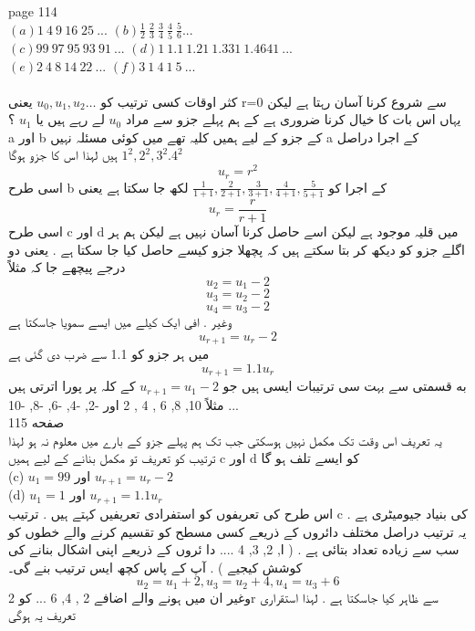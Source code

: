 page 114\\
\((a) 1 \: 4 \:  9 \:  16 \;  25 \: ... \) \hspace{10pt} \( (b)\frac{1}{2} \:  \frac{2}{3} \:  \frac{3}{4} \:  \frac{4}{5} \:  \frac{5}{6} ... \) \\ \( (c) 99 \:  97 \:  95 \:  93 \:  91 \: ... \)\hspace{10pt} \((d) 1 \:  1.1 \:  1.21 \:  1.331 \:  1.4641 \: ...\)\\ \( (e) 2 \:  4 \:  8 \: 14 \:  22 \: ... \) \hspace{10pt}\((f) 3 \:  1 \:  4 \:  1 \:  5 \: ...\)\\
\\
کثر اوقات کسی ترتیب کو
\(u_{0}, u_{1}, u_{2}\dotsc\)
یعنی
r=0
سے شروع کرنا آسان رہتا ہے لیکن یہاں اس بات کا خیال کرنا ضروری ہے کے ہم پہلے جزو سے مراد
\(u_{0}\)
لے رہے ہیں یا
\(u_{1}\)
؟
a
اور
b
کے جزو کے لیے ہمیں کلیہ تھے میں کوئی مسئلہ نہیں
a
کے اجرا دراصل
\(1^{2}, 2^{2}, 3^{2}.4^{2}\)
ہیں لہذا اس کا جزو ہوگا
\[u_{r}=r^{2}\]
اسی طرح
b
کے اجرا کو
\(\frac{1}{1+1}, \frac{2}{2+1}, \frac{3}{3+1},\frac{4}{4+1}, \frac{5}{5+1}\)
لکھ جا سکتا ہے یعنی
\[u_{r}=\frac{r}{r+1}\]
اسی طرح
c
اور
d
میں قلیہ موجود ہے لیکن اسے حاصل کرنا آسان نہیں ہے لیکن ہم ہر اگلے جزو کو دیکھ کر بتا سکتے ہیں کہ پچھلا جزو کیسے حاصل کیا جا سکتا ہے . یعنی دو درجے پیچھے جا کہ مثلاً
\[u_{2}=u_{1}-2\]
\[u_{3}=u_{2}-2\]
\[u_{4}=u_{3}-2\]
وغیر . افی ایک کیلے میں ایسے سمویا جاسکتا ہے
\[u_{r+1}=u_{r}-2\]
میں ہر جزو کو 
1.1
سے ضرب دی گئی ہے
\[u_{r+1}=1.1u_{r}\]
به قسمتی سے بہت سی ترتیبات ایسی ہیں جو
\(u_{r+1}=u_{1}-2\)
کے کلہ پر پورا اترتی ہیں مثلاً
10, 8, 6 , 4 , 2
اور
-2, -4, -6, -8, -10 ...\\
\clearpage
صفحه 115 \\
یہ تعریف اس وقت تک مکمل نہیں ہوسکتی جب تک ہم پہلے جزو کے بارے میں معلوم نہ ہو لہذا ترتیب کو تعریف تو مکمل بنانے کے لیے ہمیں
c
اور
d
کو ایسے تلف ہو گا\\
(c)
\(u_{1}=99\)
اور
\(u_{r+1}=u_{r}-2\)\\
(d)
\(u_{1}=1\)
اور
\(u_{r+1}=1.1u_{r}\)\\
اس طرح کی تعریفوں کو استفرادی تعریفیں کہتے ہیں .
ترتیب
c
کی بنیاد جیومیٹری ہے . یہ ترتیب دراصل مختلف دائروں کے ذریعے کسی مسطح کو تقسیم کرنے والے خطوں کو سب سے زیاده تعداد بتائی ہے . ( ا, 2, 3, 4 .... دا ئروں کے ذریعے اپنی اشکال بنانے کی کوشش کیجیے ) .
آپ کے پاس کچھ ایس ترتیب بنے گی۔
\[u_{2}=u_{1}+2, u_{3}=u_{2}+4, u_{4}=u_{3}+6\]
وغیر ان میں ہونے والے اضافے 2 , 4, 6 ... کو
2r
سے ظاہر کیا جاسکتا ہے . لہذا استقراری تعریف یہ ہوگی
